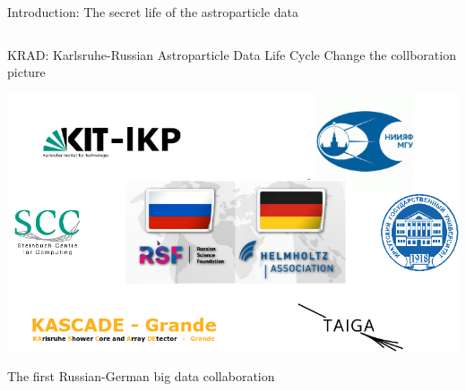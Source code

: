 \begin{frame}{Introduction: The secret life of the astroparticle data}
\begin{columns}
\begin{column}[t]{0.53\textwidth}
  \end{column}
\end{columns}
  \footnotesize{}
\end{frame}

\begin{frame}{\textcolor{kit-green100}{KRAD}: \textcolor{kit-green100}{K}arlsruhe-\textcolor{kit-green100}{R}ussian \textcolor{kit-green100}{A}stroparticle \textcolor{kit-green100}{D}ata Life Cycle}
\textcolor{red!50!black}{Change the collboration picture}
\begin{center}
  \includegraphics[width=0.9\linewidth]{pics/Collab.png}
\end{center}
\vspace{-2\parsep}
The first Russian-German big data collaboration
\end{frame}

